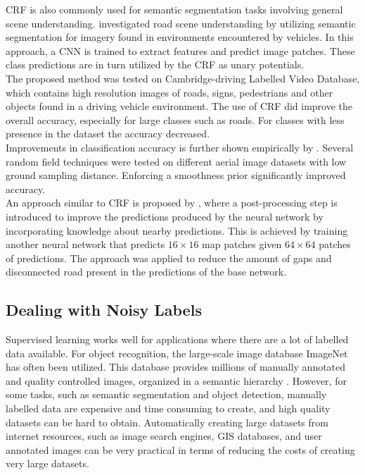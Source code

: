\ac{CRF} is also commonly used for semantic segmentation tasks involving general scene understanding. \cite{LeCun_semantic} investigated road scene understanding by utilizing semantic segmentation for imagery found in environments encountered by vehicles. In this approach, a \ac{CNN} is trained to extract features and predict image patches. These class predictions are in turn utilized by the \ac{CRF} as unary potentials.\\

The proposed method was tested on Cambridge-driving Labelled Video Database, which contains high resolution images of roads, signs, pedestrians and other objects found in a driving vehicle environment. The use of \ac{CRF} did improve the overall accuracy, especially for large classes such as roads. For classes with less presence in the dataset the accuracy decreased.\\

Improvements in classification accuracy is further shown empirically by \cite{Schindler_random_field_overview}. Several random field techniques were tested on different aerial image datasets with low ground sampling distance. Enforcing a smoothness prior significantly improved accuracy. \\

An approach similar to \ac{CRF} is proposed by \cite{Mnih_roads_high_res_aerial_images}, where a post-processing step is introduced to improve the predictions produced by the neural network by incorporating knowledge about nearby predictions. This is achieved by training another neural network that predicts $16 \times 16$ map patches given $64 \times 64$ patches of predictions. The approach was applied to reduce the amount of gaps and disconnected road present in the predictions of the base network. 

\subsection{Dealing with Noisy Labels}
Supervised learning works well for applications where there are a lot of labelled data available. For object recognition, the large-scale image database ImageNet has often been utilized. This database provides millions of manually annotated and quality controlled images, organized in a semantic hierarchy \citep{Deng_imagenet}. However, for some tasks, such as semantic segmentation and object detection, manually labelled data are expensive and time consuming to create, and high quality datasets can be hard to obtain. Automatically creating large datasets from internet resources, such as image search engines, \ac{GIS} databases, and user annotated images can be very practical in terms of reducing the costs of creating very large datasets. \\

